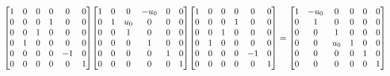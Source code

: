 \documentclass[11pt]{article}
\theoremstyle{definition}
\begin{document}
\[
\scaletoalign{\textwidth}{{\left[\begin{matrix}1 & 0 & 0 & 0 & 0 & 0\\0 & 0 & 0 & 1 & 0 & 0\\0 & 0 & 1 & 0 & 0 & 0\\0 & 1 & 0 & 0 & 0 & 0\\0 & 0 & 0 & 0 & -1 & 0\\0 & 0 & 0 & 0 & 0 & 1\end{matrix}\right]} {\left[\begin{matrix}1 & 0 & 0 & - u_{0} & 0 & 0\\0 & 1 & u_{0} & 0 & 0 & 0\\0 & 0 & 1 & 0 & 0 & 0\\0 & 0 & 0 & 1 & 0 & 0\\0 & 0 & 0 & 0 & 1 & 0\\0 & 0 & 0 & 0 & 0 & 1\end{matrix}\right]} {\left[\begin{matrix}1 & 0 & 0 & 0 & 0 & 0\\0 & 0 & 0 & 1 & 0 & 0\\0 & 0 & 1 & 0 & 0 & 0\\0 & 1 & 0 & 0 & 0 & 0\\0 & 0 & 0 & 0 & -1 & 0\\0 & 0 & 0 & 0 & 0 & 1\end{matrix}\right]} = {\left[\begin{matrix}1 & - u_{0} & 0 & 0 & 0 & 0\\0 & 1 & 0 & 0 & 0 & 0\\0 & 0 & 1 & 0 & 0 & 0\\0 & 0 & u_{0} & 1 & 0 & 0\\0 & 0 & 0 & 0 & 1 & 0\\0 & 0 & 0 & 0 & 0 & 1\end{matrix}\right]}}
\]
\end{document}
